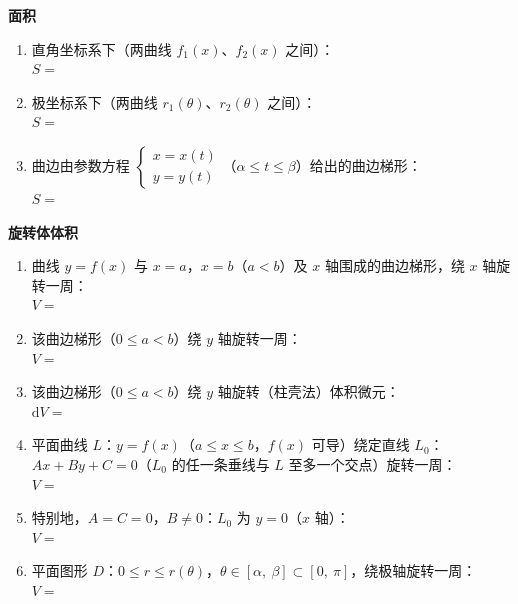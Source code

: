 \documentclass[a4paper,12pt]{article}
\begin{document}
    \pagestyle{empty}

    \begin{minipage}[t]{0.46\textwidth}
        \textbf{面积}
        \begin{enumerate}[label=(\arabic*), leftmargin=2em, itemsep=1.2em]
            \item 直角坐标系下（两曲线 $f_1(x)$、$f_2(x)$ 之间）：\\[1em] $S = $\vspace{1em}
            \item 极坐标系下（两曲线 $r_1(\theta)$、$r_2(\theta)$ 之间）：\\[1em] $S = $\vspace{1em}
            \item 曲边由参数方程 $\begin{cases} x=x(t) \\ y=y(t) \end{cases}$（$\alpha \le t \le \beta$）给出的曲边梯形：\\[1em] $S = $\vspace{1em}
        \end{enumerate}

        \textbf{旋转体体积}
        \begin{enumerate}[label=(\arabic*), leftmargin=2em, itemsep=1.2em]
            \item 曲线 $y=f(x)$ 与 $x=a$，$x=b$（$a<b$）及 $x$ 轴围成的曲边梯形，绕 $x$ 轴旋转一周：\\[1em] $V = $\vspace{1em}
            \item 该曲边梯形（$0 \le a < b$）绕 $y$ 轴旋转一周：\\[1em] $V = $\vspace{1em}
            \item 该曲边梯形（$0 \le a < b$）绕 $y$ 轴旋转（柱壳法）体积微元：\\[1em] $\mathrm{d}V = $\vspace{1em}
            \item 平面曲线 $L$：$y=f(x)$（$a \le x \le b$，$f(x)$ 可导）绕定直线 $L_0$：$Ax+By+C=0$（$L_0$ 的任一条垂线与 $L$ 至多一个交点）旋转一周：\\[1em] $V = $\vspace{1em}
            \item 特别地，$A=C=0$，$B \ne 0$：$L_0$ 为 $y=0$（$x$ 轴）：\\[1em] $V = $\vspace{1em}
            \item 平面图形 $D$：$0 \le r \le r(\theta)$，$\theta \in [\alpha,\ \beta] \subset [0,\ \pi]$，绕极轴旋转一周：\\[1em] $V = $\vspace{1em}
        \end{enumerate}
    \end{minipage}
\end{document}
